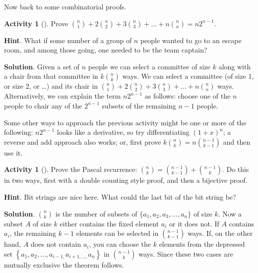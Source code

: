 \documentclass[10pt,]{book}
\theoremstyle{plain}
\theoremstyle{definition}
\theoremstyle{definition}
\theoremstyle{definition}
\newtheorem{activity}[project]{Activity}
\theoremstyle{definition}
\numberwithin{equation}{chapter}
\begin{document}
\hypertarget{p-599}{}%
Now back to some combinatorial proofs.%
\begin{activity}[]\label{act_anysizecommittee}
\hypertarget{p-600}{}%
Prove \(\binom{n}{1} + 2 \binom{n}{2} + 3 \binom{n}{3} + \ldots + n \binom{n}{n} = n2^{n - 1}\).%
\par\smallskip%
\noindent\textbf{Hint}.\hypertarget{hint-29}{}\quad%
\hypertarget{p-601}{}%
What if some number of a group of \(n\) people wanted to go to an escape room, and among those going, one needed to be the team captain?%
\par\smallskip%
\noindent\textbf{Solution}.\hypertarget{solution-49}{}\quad%
\hypertarget{p-602}{}%
Given a set of \(n\) people we can select a committee of size \(k\) along with a chair from that committee in \(k \binom{n}{k}\) ways. We can select a committee (of size 1, or size 2, or \ldots) and its chair in \(\binom{n}{1} + 2 \binom{n}{2} + 3 \binom{n}{3} + \ldots + n \binom{n}{n}\) ways. Alternatively, we can explain the term \(n2^{n - 1}\) as follows: choose one of the \(n\) people to chair any of the \(2^{n - 1}\) subsets of the remaining \(n - 1\) people.%
\end{activity}
\hypertarget{p-603}{}%
Some other ways to approach the previous activity might be one or more of the following: \(n2^{n - 1}\) looks like a derivative, so try differentiating \(\left( 1 + x \right)^{n}\); a reverse and add approach also works; or, first prove \(k \binom{n}{k} = n \binom{n - 1}{k - 1}\) and then use it.%
\begin{activity}[]\label{activity-42}
\hypertarget{p-604}{}%
Prove the Pascal recurrence: \(\binom{n}{k} = \binom{n - 1}{k-1} + \binom{n - 1}{k}\).  Do this in two ways, first with a double counting style proof, and then a bijective proof.%
\par\smallskip%
\noindent\textbf{Hint}.\hypertarget{hint-30}{}\quad%
\hypertarget{p-605}{}%
Bit strings are nice here.  What could the last bit of the bit string be?%
\par\smallskip%
\noindent\textbf{Solution}.\hypertarget{solution-50}{}\quad%
\hypertarget{p-606}{}%
 \(\binom{n}{k}\) is the number of subsets of \(\{ a_{1},a_{2},a_{3},\ldots,a_{n}\}\) of size \(k\). Now a subset \(A\) of size \(k\) either contains the fixed element \(a_{i}\) or it does not. If \(A\) contains \(a_{i}\), the remaining \(k - 1\) elements can be selected in \(\binom{n - 1}{k - 1}\) ways. If, on the other hand, \(A\) does not contain \(a_{i}\), you can choose the \(k\) elements from the depressed set \(\left\{ a_{1},a_{2},\ldots,a_{i - 1,}a_{i + 1,\ldots,}a_{n} \right\}\) in \(\binom{n - 1}{k}\) ways. Since these two cases are mutually exclusive the theorem follows.%
\end{activity}
\end{document}
